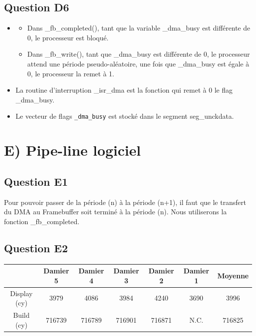 \documentclass[10pt]{article}
\begin{document}
\subsection{Question D6}
\begin{itemize}
  \item
  \begin{itemize}
    \item Dans \_fb\_completed(), tant que la variable \_dma\_busy est
    différente de 0, le processeur est bloqué.
    \item Dans \_fb\_write(), tant que \_dma\_busy est différente de 0, le
    processeur attend une période pseudo-aléatoire, une fois que \_dma\_busy est
    égale à 0, le processeur la remet à 1.
  \end{itemize}
  \item La routine d'interruption \_isr\_dma est la fonction qui remet à 0 le
  flag \_dma\_busy.
  \item Le vecteur de flags \texttt{\_dma\_busy} est stocké dans le segment
  seg\_unckdata.
\end{itemize}

\section{E) Pipe-line logiciel}

\subsection{Question E1}
Pour pouvoir passer de la période (n) à la période (n+1), il faut que le
transfert du DMA au Framebuffer soit terminé à la période (n). Nous utiliserons
la fonction \_fb\_completed.

\subsection{Question E2}
\begin{center}
  \begin{tabular}{|c|c|c|c|c|c|c|}
    \hline
     & Damier 5 & Damier 4 & Damier 3 & Damier 2 & Damier 1 & Moyenne \\ \hline
     Display (cy) & 3979 & 4086 & 3984 & 4240 & 3690 & 3996 \\ \hline
     Build (cy) & 716739 & 716789 & 716901 & 716871 & N.C. & 716825 \\ \hline
  \end{tabular}
\end{center}
\end{document}
